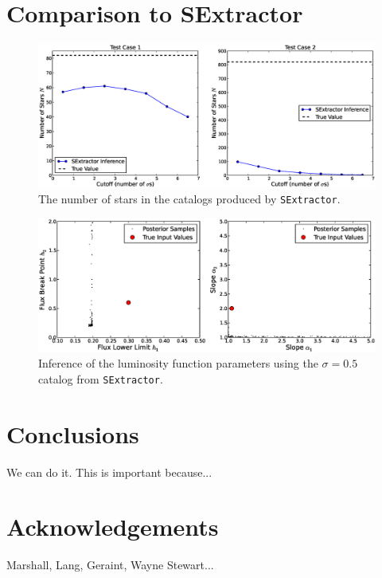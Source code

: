 \documentclass[manuscript]{aastex}
\newcommand{\sex}{{\tt SExtractor}}
\begin{document}
\section{Comparison to SExtractor}

\begin{figure}
\begin{center}
\includegraphics[scale=0.45]{Figures/sex_N.eps}
\end{center}
\caption{The number of stars in the catalogs produced by \sex.\label{fig:sex_N}}
\end{figure}

\begin{figure}
\begin{center}
\includegraphics[scale=0.45]{Figures/sex_inference.eps}
\end{center}
\caption{Inference of the luminosity function parameters using the $\sigma=0.5$
catalog from \sex.\label{fig:sex_inference}}
\end{figure}


\section{Conclusions}
We can do it. This is important because...

\section{Acknowledgements}
Marshall, Lang, Geraint, Wayne Stewart...
\end{document}
